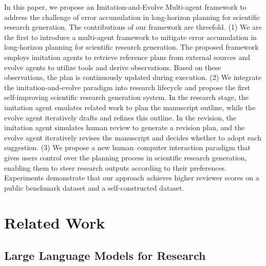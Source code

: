 \documentclass[manuscript,review,anonymous]{acmart}
\begin{document}
In this paper, we propose an Imitation-and-Evolve Multi-agent framework to address the challenge of error accumulation in long-horizon planning for scientific research generation. The contributions of our framework are threefold. (1) We are the first to introduce a multi-agent framework to mitigate error accumulation in long-horizon planning for scientific research generation. The proposed framework employs imitation agents to retrieve reference plans from external sources and evolve agents to utilize tools and derive observations. Based on these observations, the plan is continuously updated during execution. (2) We integrate the imitation-and-evolve paradigm into research lifecycle and propose the first self-improving scientific research generation system. In the research stage, the imitation agent emulates related work to plan the manuscript outline, while the evolve agent iteratively drafts and refines this outline. In the revision, the imitation agent simulates human review to generate a revision plan, and the evolve agent iteratively revises the manuscript and decides whether to adopt each suggestion. (3) We propose a new human–computer interaction paradigm that gives users control over the planning process in scientific research generation, enabling them to steer research outputs according to their preferences. Experiments demonstrate that our approach achieves higher reviewer scores on a public benchmark dataset \cite{weng2025cycleresearcher} and a self-constructed dataset.

\section{Related Work}

\subsection{Large Language Models for Research}
\end{document}
